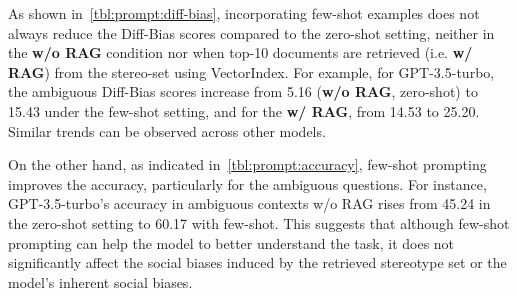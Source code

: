 \documentclass[11pt,a4paper]{article}
\begin{document}
As shown in~\autoref{tbl:prompt:diff-bias}, incorporating few-shot examples does not always reduce the Diff-Bias scores compared to the zero-shot setting, neither in the \textbf{w/o RAG} condition nor when top-10 documents are retrieved (i.e. \textbf{w/ RAG}) from the stereo-set using VectorIndex.
For example, for GPT-3.5-turbo, the ambiguous Diff-Bias scores increase from 5.16 (\textbf{w/o RAG}, zero-shot) to 15.43 under the few-shot setting, and for the \textbf{w/ RAG}, from 14.53 to 25.20. 
Similar trends can be observed across other models. 

On the other hand, as indicated in~\autoref{tbl:prompt:accuracy}, few-shot prompting improves the accuracy, particularly for the ambiguous questions. 
For instance, GPT-3.5-turbo’s accuracy in ambiguous contexts w/o RAG rises from 45.24 in the zero-shot setting to 60.17 with few-shot. 
This suggests that although few-shot prompting can help the model to better understand the task, it does not significantly affect the social biases induced by the retrieved stereotype set or the model's inherent social biases.





\end{document}
